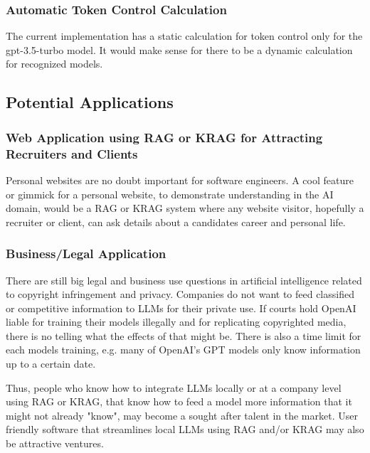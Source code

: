 \subsubsection{Automatic Token Control Calculation}
The current implementation has a static calculation for token control only for the gpt-3.5-turbo model. It would make sense for there to be a dynamic calculation for recognized models.

\subsection{Potential Applications}
\subsubsection{Web Application using RAG or KRAG for Attracting Recruiters and Clients}
Personal websites are no doubt important for software engineers. A cool feature or gimmick for a personal website, to demonstrate understanding in the AI domain, would be a RAG or KRAG system where any website visitor, hopefully a recruiter or client, can ask details about a candidates career and personal life.

\subsubsection{Business/Legal Application}
There are still big legal and business use questions in artificial intelligence related to copyright infringement and privacy. Companies do not want to feed classified or competitive information to LLMs for their private use. If courts hold OpenAI liable for training their models illegally and for replicating copyrighted media, there is no telling what the effects of that might be. There is also a time limit for each models training, e.g. many of OpenAI's GPT models only know information up to a certain date. 
\par

Thus, people who know how to integrate LLMs locally or at a company level using RAG or KRAG, that know how to feed a model more information that it might not already "know", may become a sought after talent in the market. User friendly software that streamlines local LLMs using RAG and/or KRAG may also be attractive ventures.